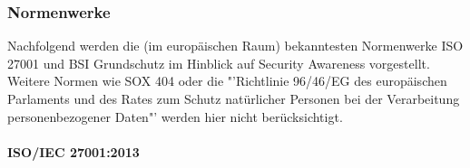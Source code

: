 \documentclass[../../main.tex]{subfiles}
\begin{document}
\subsubsection{Normenwerke}

\begin{sloppypar}
Nachfolgend werden die (im europäischen Raum) bekanntesten Normenwerke ISO 27001 und BSI Grundschutz im Hinblick auf Security Awareness vorgestellt. Weitere Normen wie SOX 404 oder die "'Richtlinie 96/46/EG des europäischen Parlaments und des Rates zum Schutz natürlicher Personen bei der Verarbeitung personenbezogener Daten"' werden hier nicht berücksichtigt.
\end{sloppypar}

\paragraph*{ISO/IEC 27001:2013}\mbox{}
\end{document}
